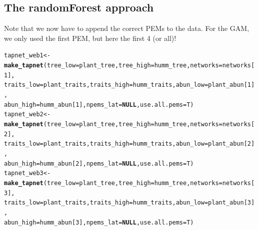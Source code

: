\documentclass[a4paper, 11pt]{article}\usepackage[]{graphicx}\usepackage[]{color}
\makeatletter
\newcommand{\hlnum}[1]{\textcolor[rgb]{0.686,0.059,0.569}{#1}}%
\newcommand{\hlstd}[1]{\textcolor[rgb]{0.345,0.345,0.345}{#1}}%
\newcommand{\hlkwa}[1]{\textcolor[rgb]{0.161,0.373,0.58}{\textbf{#1}}}%
\newcommand{\hlkwb}[1]{\textcolor[rgb]{0.69,0.353,0.396}{#1}}%
\newcommand{\hlkwc}[1]{\textcolor[rgb]{0.333,0.667,0.333}{#1}}%
\newcommand{\hlkwd}[1]{\textcolor[rgb]{0.737,0.353,0.396}{\textbf{#1}}}%
\newenvironment{kframe}{%
 \def\at@end@of@kframe{}%
 \ifinner\ifhmode%
  \def\at@end@of@kframe{\end{minipage}}%
  \begin{minipage}{\columnwidth}%
 \fi\fi%
 \def\FrameCommand##1{\hskip\@totalleftmargin \hskip-\fboxsep
 \colorbox{shadecolor}{##1}\hskip-\fboxsep
     \hskip-\linewidth \hskip-\@totalleftmargin \hskip\columnwidth}%
 \MakeFramed {\advance\hsize-\width
   \@totalleftmargin\z@ \linewidth\hsize
   \@setminipage}}%
 {\par\unskip\endMakeFramed%
 \at@end@of@kframe}
\newenvironment{knitrout}{}{} %
\makeatother
\begin{document}
\subsection{The randomForest approach}
Note that we now have to append the correct PEMs to the data. For the GAM, we only used the first PEM, but here the first 4 (or all)!
\begin{knitrout}\small
{}\color{fgcolor}\begin{kframe}
\begin{alltt}
\hlstd{tapnet_web1} \hlkwb{<-} \hlkwd{make_tapnet}\hlstd{(}\hlkwc{tree_low}\hlstd{=plant_tree,} \hlkwc{tree_high}\hlstd{=humm_tree,} \hlkwc{networks}\hlstd{=networks[}\hlnum{1}\hlstd{],}
              \hlkwc{traits_low}\hlstd{=plant_traits,} \hlkwc{traits_high}\hlstd{=humm_traits,} \hlkwc{abun_low}\hlstd{=plant_abun[}\hlnum{1}\hlstd{],}
              \hlkwc{abun_high}\hlstd{=humm_abun[}\hlnum{1}\hlstd{],} \hlkwc{npems_lat}\hlstd{=}\hlkwa{NULL}\hlstd{,} \hlkwc{use.all.pems}\hlstd{=T)}
\hlstd{tapnet_web2} \hlkwb{<-} \hlkwd{make_tapnet}\hlstd{(}\hlkwc{tree_low}\hlstd{=plant_tree,} \hlkwc{tree_high}\hlstd{=humm_tree,} \hlkwc{networks}\hlstd{=networks[}\hlnum{2}\hlstd{],}
              \hlkwc{traits_low}\hlstd{=plant_traits,} \hlkwc{traits_high}\hlstd{=humm_traits,} \hlkwc{abun_low}\hlstd{=plant_abun[}\hlnum{2}\hlstd{],}
              \hlkwc{abun_high}\hlstd{=humm_abun[}\hlnum{2}\hlstd{],} \hlkwc{npems_lat}\hlstd{=}\hlkwa{NULL}\hlstd{,} \hlkwc{use.all.pems}\hlstd{=T)}
\hlstd{tapnet_web3} \hlkwb{<-} \hlkwd{make_tapnet}\hlstd{(}\hlkwc{tree_low}\hlstd{=plant_tree,} \hlkwc{tree_high}\hlstd{=humm_tree,} \hlkwc{networks}\hlstd{=networks[}\hlnum{3}\hlstd{],}
              \hlkwc{traits_low}\hlstd{=plant_traits,} \hlkwc{traits_high}\hlstd{=humm_traits,} \hlkwc{abun_low}\hlstd{=plant_abun[}\hlnum{3}\hlstd{],}
              \hlkwc{abun_high}\hlstd{=humm_abun[}\hlnum{3}\hlstd{],} \hlkwc{npems_lat}\hlstd{=}\hlkwa{NULL}\hlstd{,} \hlkwc{use.all.pems}\hlstd{=T)}
\end{alltt}
\end{kframe}
\end{knitrout}
\end{document}
